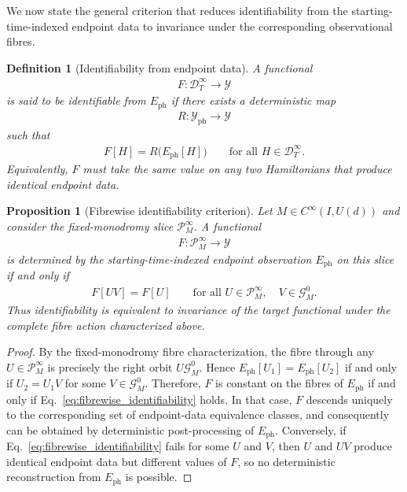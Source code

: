 \documentclass[twocolumn,prl,aps,floatfix]{revtex4-2}
\newtheorem{proposition}{Proposition}
\newtheorem{definition}{Definition}
\begin{document}
We now state the general criterion that reduces identifiability from the starting-time-indexed endpoint data to invariance under the corresponding observational fibres.

\begin{definition}[Identifiability from endpoint data]
A functional
\begin{align}
F:\mathcal D_T^\infty\longrightarrow\mathcal Y
\end{align}
is said to be \emph{identifiable from} $E_{\mathrm{ph}}$ if there exists a deterministic map
\begin{align}
R:\mathcal Y_{\mathrm{ph}}\longrightarrow\mathcal Y
\end{align}
such that
\begin{align}
F[H]=R\bigl(E_{\mathrm{ph}}[H]\bigr)
\qquad
\text{for all }H\in\mathcal D_T^\infty .
\end{align}
Equivalently, $F$ must take the same value on any two Hamiltonians that produce identical endpoint data.
\end{definition}

\begin{proposition}[Fibrewise identifiability criterion]
Let $M\in C^\infty(I,U(d))$ and consider the fixed-monodromy slice
$\mathcal P_M^\infty$. A functional
\begin{align}
F:\mathcal P_M^\infty\longrightarrow\mathcal Y
\end{align}
is determined by the starting-time-indexed endpoint observation $E_{\mathrm{ph}}$ on this slice if and only if
\begin{align}
F[UV]=F[U]
\qquad
\text{for all }U\in\mathcal P_M^\infty,\quad
V\in\mathcal G_M^0 .
\label{eq:fibrewise_identifiability}
\end{align}
Thus identifiability is equivalent to invariance of the target functional under the complete fibre action characterized above.
\end{proposition}

\begin{proof}
By the fixed-monodromy fibre characterization, the fibre through any
$U\in\mathcal P_M^\infty$ is precisely the right orbit
$U\mathcal G_M^0$. Hence $E_{\mathrm{ph}}[U_1]=E_{\mathrm{ph}}[U_2]$ if and only if
$U_2=U_1V$ for some $V\in\mathcal G_M^0$. Therefore, $F$ is constant on the fibres of $E_{\mathrm{ph}}$ if and only if Eq.~\eqref{eq:fibrewise_identifiability} holds. In that case, $F$ descends uniquely to the corresponding set of endpoint-data equivalence classes, and consequently can be obtained by deterministic post-processing of $E_{\mathrm{ph}}$. Conversely, if Eq.~\eqref{eq:fibrewise_identifiability} fails for some $U$ and $V$, then $U$ and $UV$ produce identical endpoint data but different values of $F$, so no deterministic reconstruction from $E_{\mathrm{ph}}$ is possible.
\end{proof}
\end{document}
